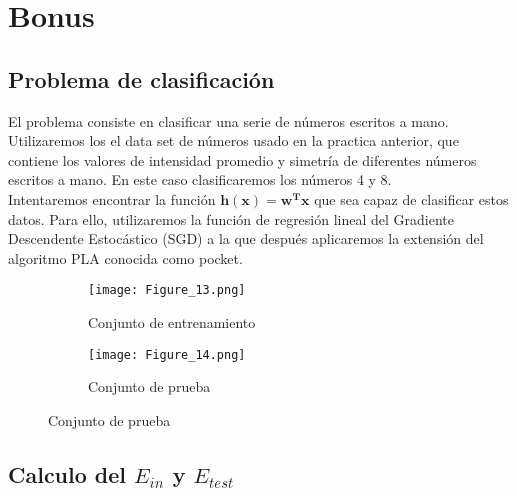 \chapter{Bonus}

\section{Problema de clasificación}
El problema consiste en clasificar una serie de números escritos a mano. Utilizaremos los el data set de números usado en la practica anterior, que contiene los valores de intensidad promedio y simetría de diferentes números escritos a mano. En este caso clasificaremos los números 4 y 8.\\
Intentaremos encontrar la función $ \mathbf{h(x) = w^{T}x} $ que sea capaz de clasificar estos datos.
Para ello, utilizaremos la función de regresión lineal del Gradiente Descendente Estocástico (SGD) a la que después aplicaremos la extensión del algoritmo PLA conocida como pocket.

\begin{figure}[h]
   \centering
   \begin{subfigure}[b]{0.45\textwidth}
      \texttt{[image: Figure\_13.png]}
      \caption{Conjunto de entrenamiento}
   \end{subfigure}
   \hfill
   \begin{subfigure}[b]{0.45\textwidth}
      \texttt{[image: Figure\_14.png]}
      \caption{Conjunto de prueba}
   \end{subfigure}
\end{figure}

\section{Calculo del $ E_{in} $ y $ E_{test} $}


